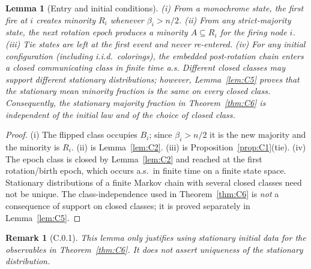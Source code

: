 \documentclass[preprint,12pt]{elsarticle}
\newtheorem{lemma}[theorem]{Lemma}
\newtheorem{remark}{Remark}[theorem]
\begin{document}
\begin{lemma}[Entry and initial conditions]
\label{lem:C0}
(i) From a monochrome state, the first fire at $i$ creates minority
$R_i$ whenever $\beta_i>n/2$. (ii) From any strict-majority state, the
next rotation epoch produces a minority $A\subseteq R_{i}$ for the
firing node $i$. (iii) Tie states are left at the first event and never
re-entered. (iv) For any initial configuration (including i.i.d.\
colorings), the embedded post-rotation chain enters a closed communicating
class in finite time a.s. Different closed classes may support different
stationary distributions; however, Lemma~\ref{lem:C5} proves that the
stationary mean minority fraction is the same on every closed class.
Consequently, the stationary majority fraction in Theorem~\ref{thm:C6}
is independent of the initial law and of the choice of closed class.
\end{lemma}
\begin{proof}
(i) The flipped class occupies $B_i$; since $\beta_i>n/2$ it is the new
majority and the minority is $R_i$. (ii) is Lemma~\ref{lem:C2}.
(iii) is Proposition~\ref{prop:C1}(tie). (iv) The epoch class is closed
by Lemma~\ref{lem:C2} and reached at the first rotation/birth epoch,
which occurs a.s.\ in finite time on a finite state space. Stationary
distributions of a finite Markov chain with several closed classes need
not be unique. The class-independence used in Theorem~\ref{thm:C6} is
\emph{not} a consequence of support on closed classes; it is proved
separately in Lemma~\ref{lem:C5}.
\end{proof}
\begin{remark}[C.0.1]
\label{rem:C0.1}
This lemma only justifies using stationary initial data for the
observables in Theorem~\ref{thm:C6}. It does not assert uniqueness of the
stationary distribution.
\end{remark}
\end{document}
